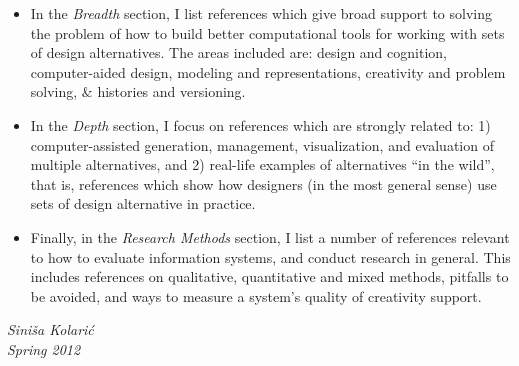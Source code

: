 \begin{itemize}

\item
In the {\em Breadth} section, I list references which give broad support
to solving the problem of how to build better computational tools for working with 
sets of design alternatives. The areas included are: 
design and cognition, 
computer-aided design,
modeling and representations,
creativity and problem solving,
\& histories and versioning.

\item
In the {\em Depth} section, I focus on references which are strongly related to:
1) computer-assisted generation, management,
visualization, and evaluation of multiple alternatives, and 
2) real-life examples of alternatives ``in the wild'', that is, references
which show how designers (in the most general sense) use sets of design alternative in practice.


\item Finally, in the {\em Research Methods} section, 
I %
list a number of references relevant
to how to evaluate information systems, and conduct research in general. %
This includes references on  
qualitative, quantitative and mixed methods,
pitfalls to be avoided,
and ways to measure a system's quality of creativity support.

\end{itemize}

\begin{flushright}
\em
Sini\v{s}a Kolari\'c\\
Spring 2012
\end{flushright}
% 
% 
% 

